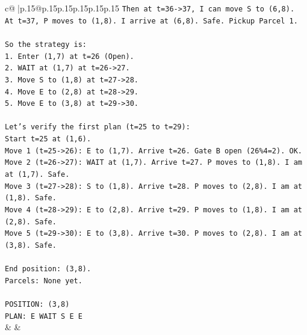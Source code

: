 \documentclass{article}
\begin{document}
{\begin{supertabular}{c@{$\;$}|p{.15\linewidth}@{}p{.15\linewidth}p{.15\linewidth}p{.15\linewidth}p{.15\linewidth}p{.15\linewidth}}
{{{\texttt{Then at t=36{-}>37, I can move S to (6,8).} \\
\texttt{At t=37, P moves to (1,8). I arrive at (6,8). Safe. Pickup Parcel 1.} \\
\\ 
\texttt{So the strategy is:} \\
\texttt{1. Enter (1,7) at t=26 (Open).} \\
\texttt{2. WAIT at (1,7) at t=26{-}>27.} \\
\texttt{3. Move S to (1,8) at t=27{-}>28.} \\
\texttt{4. Move E to (2,8) at t=28{-}>29.} \\
\texttt{5. Move E to (3,8) at t=29{-}>30.} \\
\\ 
\texttt{Let's verify the first plan (t=25 to t=29):} \\
\texttt{Start t=25 at (1,6).} \\
\texttt{Move 1 (t=25{-}>26): E to (1,7). Arrive t=26. Gate B open (26\%4=2). OK.} \\
\texttt{Move 2 (t=26{-}>27): WAIT at (1,7). Arrive t=27. P moves to (1,8). I am at (1,7). Safe.} \\
\texttt{Move 3 (t=27{-}>28): S to (1,8). Arrive t=28. P moves to (2,8). I am at (1,8). Safe.} \\
\texttt{Move 4 (t=28{-}>29): E to (2,8). Arrive t=29. P moves to (1,8). I am at (2,8). Safe.} \\
\texttt{Move 5 (t=29{-}>30): E to (3,8). Arrive t=30. P moves to (2,8). I am at (3,8). Safe.} \\
\\ 
\texttt{End position: (3,8).} \\
\texttt{Parcels: None yet.} \\
\\ 
\texttt{POSITION: (3,8)} \\
\texttt{PLAN: E WAIT S E E} \\
            }
        }
    }
    & & \\ \\


\end{supertabular}}
\end{document}

